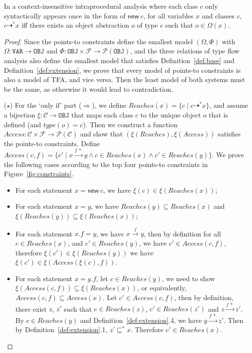 \documentclass{llncs}
\newcommand{\keyword}[1]{\mathsf{#1}}
\newcommand{\kwnew}[0]{\keyword{new}}
\newcommand\Var{\mathtt{VAR}}
\newcommand\Obj{\mathtt{OBJ}}
\newcommand{\VPT}{\Omega}
\newcommand{\HPT}{\Phi}
\newcommand{\Class}{\mathcal{C}}
\newcommand{\Field}{\mathcal{F}}
\newcommand{\less}{\sqsubseteq}
\newcommand{\tflow}{\dashrightarrow}
\newcommand{\hflow}{\longrightarrow}
\newcommand{\lhflow}[1]{\stackrel{#1}{\hflow}}
\newcommand\set[1]{\{#1\}}
\newcommand\power{\mathcal{P}}
\begin{document}
\begin{lemma}\label{lem:tfa-intra}
In a context-insensitive intraprocedural analysis where each class $c$ only syntactically appears once in the form of $\kwnew\ c$, for all variables $x$ and classes $c$, $c\tflow^*x$ iff there exists an object abstraction $o$ of type $c$ such that $o\in\VPT(x)$.
\end{lemma}
\begin{proof}
Since the points-to constraints define the smallest model $(\VPT, \HPT)$ with $\VPT:\Var\rightarrow\Obj$ and $\HPT:\Obj\times\Field\rightarrow\power(\Obj)$, and the three relations of type flow analysis also define the smallest model that satisfies Definition~\ref{def:base} and Definition~\ref{def:extension}, we prove that every model of points-to constraints is also a model of TFA, and vice versa. Then the least model of both systems must be the same, as otherwise it would lead to contradiction.

\medskip

($\star$) For the `only if' part ($\Rightarrow$), we define $Reaches(x)=\set{c\mid c\tflow^* x}$, and assume a bijection $\xi:\Class\rightarrow\Obj$ that maps each class $c$ to the unique object $o$ that is defined (and $type(o)=c$). Then we construct a function $Access:\Class\times\Field\rightarrow\power(\Class)$ and show that $(\xi(Reaches),\xi(Access))$ satisfies the points-to constraints. Define $Access(c,f)=\set{c'\mid x\lhflow{f\ *}y\wedge c\in Reaches(x)\wedge c'\in Reaches(y)}$. We prove the following cases according to the top four points-to constraints in Figure~\ref{fig:constraints}.
\begin{itemize}
\item For each statement $x = \kwnew\ c$, we have $\xi(c)\in\xi(Reaches(x))$;
\item For each statement $x = y$, we have $Reaches(y)\subseteq Reaches(x)$ and $\xi(Reaches(y))\subseteq\xi(Reaches(x))$;
\item For each statement $x.f = y$, we have $x\lhflow{f}y$, then by definition for all $c\in Reaches(x)$, and $c'\in Reaches(y)$, we have $c'\in Access(c,f)$, therefore $\xi(c')\in\xi(Reaches(y))$ we have $\xi(c')\in \xi(Access(\xi(c),f))$.
\item For each statement $x = y.f$, let $c\in Reaches(y)$, we need to show $\xi(Access(c,f))\subseteq\xi(Reaches(x))$, or equivalently, $Access(c,f)\subseteq Access(x)$. Let $c'\in Access(c,f)$, then by definition, there exist $z$, $z'$ such that $c\in Reaches(z)$, $c'\in Reaches(z')$ and $z\lhflow{f\ *}z'$. By $c\in Reaches(y)$ and Definition~\ref{def:extension}.4, we have $y\lhflow{f\ *}z'$. Then by Definition~\ref{def:extension}.1, $z'\less^*x$. Therefore $c'\in Reaches(x)$.
\end{itemize}


\end{proof}
\end{document}
